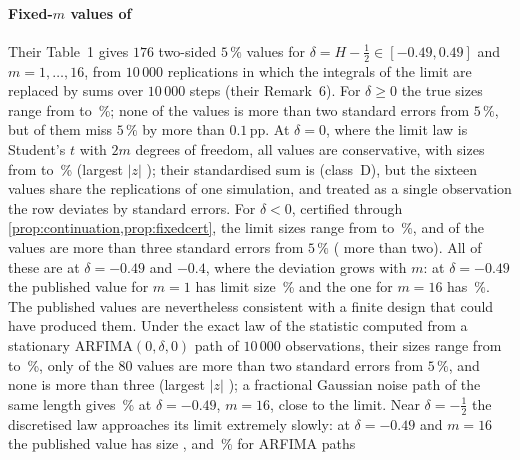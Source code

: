 \paragraph{Fixed-$m$ values of \citet{HI17}} Their Table~1 gives $176$ two-sided $5\,\%$ values for
$\delta=H-\frac12\in[-0.49,0.49]$ and $m=1,\dots,16$, from $10\,000$ replications in which the integrals of the limit
are replaced by sums over $10\,000$ steps (their Remark~6). For $\delta\ge0$ the true sizes range from
 to \,\%; none of the  values is more than two
standard errors from $5\,\%$, but  of them miss $5\,\%$ by more than $0.1$\,pp. At $\delta=0$,
where the limit law is Student's $t$ with $2m$ degrees of freedom, all  values are conservative,
with sizes from  to \,\% (largest $|z|$ ); their
standardised sum is  (class~D), but the sixteen values share the replications of one
simulation, and treated as a single observation the row deviates by  standard errors. For $\delta<0$,
certified through \cref{prop:continuation,prop:fixedcert}, the limit sizes range from  to
\,\%, and  of the  values are more than three
standard errors from $5\,\%$ ( more than two). All of these are at $\delta=-0.49$ and $-0.4$, where the deviation grows with $m$: at
$\delta=-0.49$ the published value for $m=1$ has limit size \,\% and the one for $m=16$
has \,\%. The published values are nevertheless consistent with a finite design that could
have produced them. Under the exact law of the statistic computed from a stationary ARFIMA$(0,\delta,0)$ path of $10\,000$
observations, their sizes range from  to \,\%, only
 of the $80$ values are more than two standard errors from $5\,\%$, and none is more than
three (largest $|z|$ ); a fractional Gaussian noise path of the same length gives
\,\% at $\delta=-0.49$, $m=16$, close to the limit. Near $\delta=-\frac12$ the discretised
law approaches its limit extremely slowly: at $\delta=-0.49$ and $m=16$ the published value has size
,  and \,\% for ARFIMA paths
